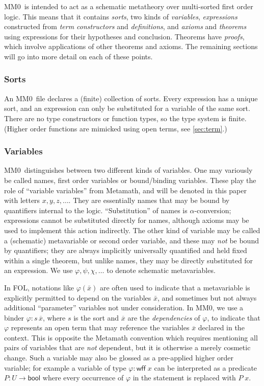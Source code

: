 \documentclass[runningheads]{llncs}
\newcommand{\mmO}{\textsf{MM0}}
\begin{document}
\mmO\ is intended to act as a schematic metatheory over multi-sorted first order logic. This means that it contains \emph{sorts}, two kinds of \emph{variables}, \emph{expressions} constructed from \emph{term constructors} and \emph{definitions}, and \emph{axioms} and \emph{theorems} using expressions for their hypotheses and conclusion. Theorems have \emph{proofs}, which involve applications of other theorems and axioms. The remaining sections will go into more detail on each of these points.

\subsubsection{Sorts}
An \mmO\ file declares a (finite) collection of sorts. Every expression has a unique sort, and an expression can only be substituted for a variable of the same sort. There are no type constructors or function types, so the type system is finite.
(Higher order functions are mimicked using open terms, see \autoref{sec:term}.)

\subsubsection{Variables}
\mmO\ distinguishes between two different kinds of variables. One may variously be called names, first order variables or bound/binding variables. These play the role of ``variable variables'' from Metamath, and will be denoted in this paper with letters $x,y,z,\dots.$ They are essentially names that may be bound by quantifiers internal to the logic. ``Substitution'' of names is $\alpha$-conversion; expressions cannot be substituted directly for names, although axioms may be used to implement this action indirectly. The other kind of variable may be called a (schematic) metavariable or second order variable, and these may \emph{not} be bound by quantifiers; they are always implicitly universally quantified and held fixed within a single theorem, but unlike names, they may be directly substituted for an expression. We use $\varphi,\psi,\chi,\dots$ to denote schematic metavariables.

In FOL, notations like $\varphi(\bar x)$ are often used to indicate that a metavariable is explicitly permitted to depend on the variables $\bar x$, and sometimes but not always additional ``parameter'' variables not under consideration. In \mmO, we use a binder $\varphi:s\,\overline{x}$, where $s$ is the sort and $\overline{x}$ are the \emph{dependencies} of $\varphi$, to indicate that $\varphi$ represents an open term that may reference the variables $\overline{x}$ declared in the context. This is opposite the Metamath convention which requires mentioning all pairs of variables that are \emph{not} dependent, but it is otherwise a merely cosmetic change. Such a variable may also be glossed as a pre-applied higher order variable; for example a variable of type $\varphi:\mathsf{wff}\;x$ can be interpreted as a predicate $P:U\to\mathsf{bool}$ where every occurrence of $\varphi$ in the statement is replaced with $P\;x$.
\end{document}
